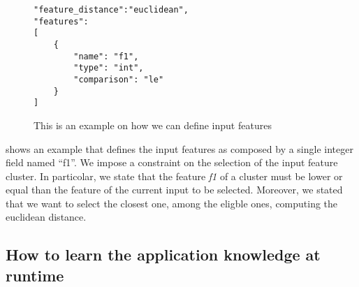 \begin{figure}
\lstset{language=json}
\begin{lstlisting}
"feature_distance":"euclidean",
"features":
[
	{
		"name": "f1",
		"type": "int",
		"comparison": "le"
	}
]
\end{lstlisting}
\caption{This is an example on how we can define input features}
\label{code:features}
\end{figure}


 shows an example that defines the input features as composed by a single integer field named ``f1''.
We impose a constraint on the selection of the input feature cluster.
In particolar, we state that the feature \textit{f1} of a cluster must be lower or equal than the feature of the current input to be selected.
Moreover, we stated that we want to select the closest one, among the eligble ones, computing the euclidean distance.





\subsection{How to learn the application knowledge at runtime}
\label{ssec:agora_element}


